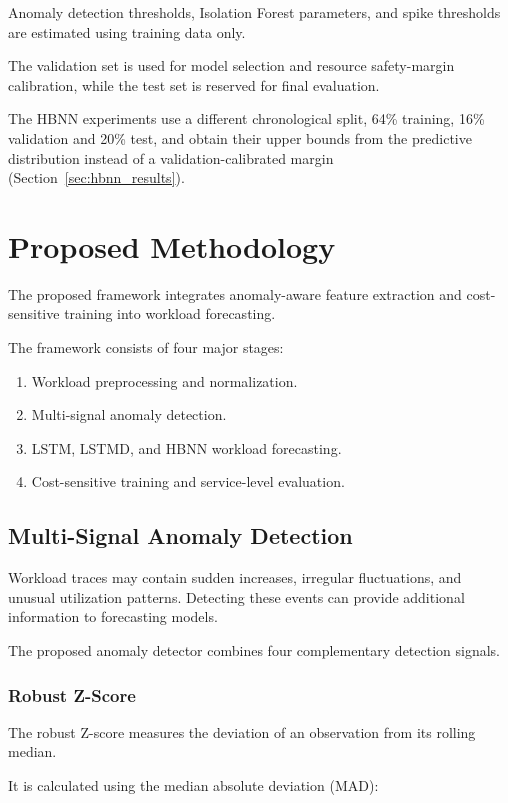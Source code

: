 \documentclass[conference]{IEEEtran}
\begin{document}
Anomaly detection thresholds, Isolation Forest parameters, and spike thresholds are estimated using training data only.

The validation set is used for model selection and resource safety-margin calibration, while the test set is reserved for final evaluation.

The HBNN experiments use a different chronological split, 64\% training, 16\% validation and 20\% test, and obtain their upper bounds from the predictive distribution instead of a validation-calibrated margin (Section~\ref{sec:hbnn_results}).

\section{Proposed Methodology}

The proposed framework integrates anomaly-aware feature extraction and cost-sensitive training into workload forecasting.

The framework consists of four major stages:

\begin{enumerate}
\item Workload preprocessing and normalization.
\item Multi-signal anomaly detection.
\item LSTM, LSTMD, and HBNN workload forecasting.
\item Cost-sensitive training and service-level evaluation.
\end{enumerate}

\subsection{Multi-Signal Anomaly Detection}

Workload traces may contain sudden increases, irregular fluctuations, and unusual utilization patterns. Detecting these events can provide additional information to forecasting models.

The proposed anomaly detector combines four complementary detection signals.

\subsubsection{Robust Z-Score}

The robust Z-score measures the deviation of an observation from its rolling median.

It is calculated using the median absolute deviation (MAD):
\end{document}
